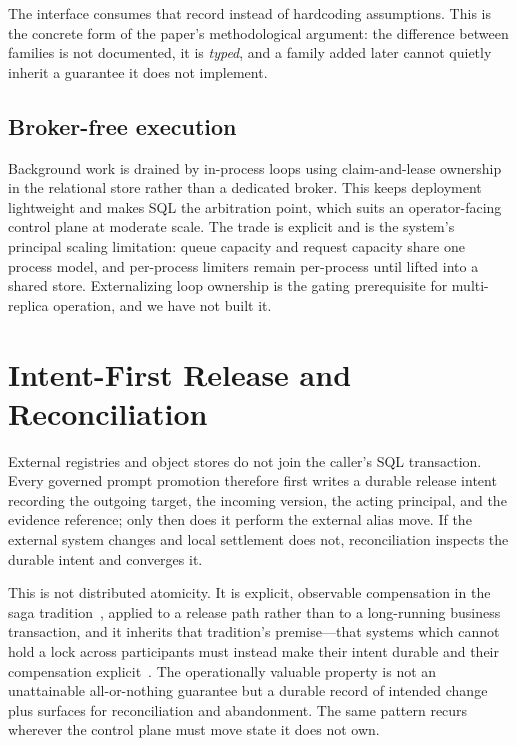 \documentclass{article}
\begin{document}
The interface consumes that record instead of hardcoding assumptions. This is the
concrete form of the paper's methodological argument: the difference between
families is not documented, it is \emph{typed}, and a family added later cannot
quietly inherit a guarantee it does not implement.

\subsection{Broker-free execution}

Background work is drained by \statLoops{} in-process loops using claim-and-lease
ownership in the relational store rather than a dedicated broker. This keeps
deployment lightweight and makes SQL the arbitration point, which suits an
operator-facing control plane at moderate scale. The trade is explicit and is the
system's principal scaling limitation: queue capacity and request capacity share one
process model, and per-process limiters remain per-process until lifted into a
shared store. Externalizing loop ownership is the gating prerequisite for
multi-replica operation, and we have not built it.

\section{Intent-First Release and Reconciliation}
\label{sec:intent}

External registries and object stores do not join the caller's SQL transaction.
Every governed prompt promotion therefore first writes a durable release intent
recording the outgoing target, the incoming version, the acting principal, and the
evidence reference; only then does it perform the external alias move. If the
external system changes and local settlement does not, reconciliation inspects the
durable intent and converges it.

This is not distributed atomicity. It is explicit, observable compensation in the
saga tradition~\cite{garciamolina1987sagas}, applied to a release path rather than
to a long-running business transaction, and it inherits that tradition's
premise---that systems which cannot hold a lock across participants must instead
make their intent durable and their compensation
explicit~\cite{helland2007apostates,gray1981transaction}. The operationally valuable
property is not an unattainable all-or-nothing guarantee but a durable record of
intended change plus surfaces for reconciliation and abandonment. The same pattern
recurs wherever the control plane must move state it does not own.
\end{document}
